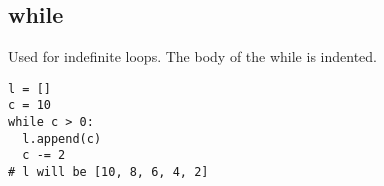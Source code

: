 \subsection{while}
Used for indefinite loops. The body of the while is indented.

\begin{lstlisting}
l = []
c = 10
while c > 0:
  l.append(c)
  c -= 2
# l will be [10, 8, 6, 4, 2]
\end{lstlisting}
